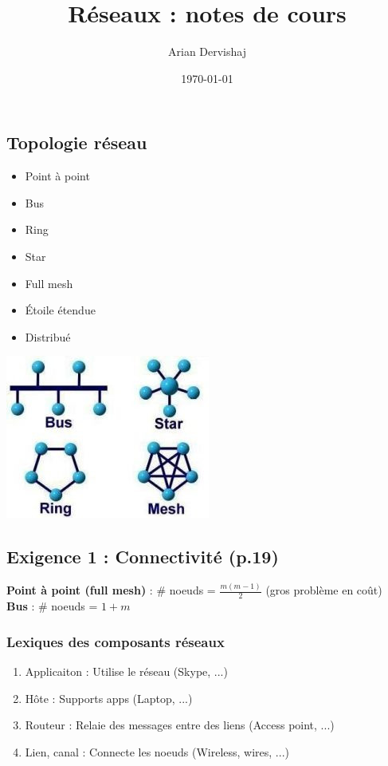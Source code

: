 \documentclass[a4paper, 12pt]{article}
\title{Réseaux : notes de cours}
\author{Arian Dervishaj}
\date{\today}
\begin{document}
\maketitle
\pagebreak

\subsection*{Topologie réseau}
\begin{minipage}{0.3\textwidth}
    \begin{itemize}
        \item Point à point
        \item Bus
        \item Ring
        \item Star
        \item Full mesh
        \item Étoile étendue
        \item Distribué
    \end{itemize}
\end{minipage}
\begin{minipage}{0.6\textwidth}
    \includegraphics{topologie.jpeg}
\end{minipage}

\subsection*{Exigence 1 : Connectivité (p.19)}


\textbf{Point à point (full mesh) }: \# noeuds = $\frac{m(m-1)}{2}$ (gros problème en coût)\\
\textbf{Bus} : \# noeuds = $1+m$

\subsubsection*{Lexiques des composants réseaux}
\begin{enumerate}
    \item Applicaiton : Utilise le réseau (Skype, ...)
    \item Hôte : Supports apps (Laptop, ...)
    \item Routeur : Relaie des messages entre des liens (Access point, ...)
    \item Lien, canal : Connecte les noeuds (Wireless, wires, ...)
\end{enumerate}
\end{document}
